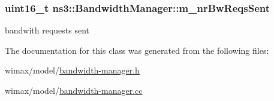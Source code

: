 \subsubsection[{\texorpdfstring{m\+\_\+nr\+Bw\+Reqs\+Sent}{m_nrBwReqsSent}}]{\setlength{\rightskip}{0pt plus 5cm}uint16\+\_\+t ns3\+::\+Bandwidth\+Manager\+::m\+\_\+nr\+Bw\+Reqs\+Sent\hspace{0.3cm}{\ttfamily [private]}}\hypertarget{classns3_1_1BandwidthManager_a18a831b18bb05ea6c9c48b77c3f1ac17}{}\label{classns3_1_1BandwidthManager_a18a831b18bb05ea6c9c48b77c3f1ac17}


bandwith requests sent 



The documentation for this class was generated from the following files\+:\begin{DoxyCompactItemize}
\item 
wimax/model/\hyperlink{bandwidth-manager_8h}{bandwidth-\/manager.\+h}\item 
wimax/model/\hyperlink{bandwidth-manager_8cc}{bandwidth-\/manager.\+cc}\end{DoxyCompactItemize}
